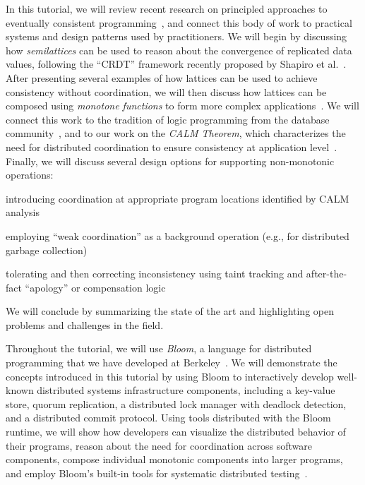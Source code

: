 \documentclass{sig-alternate}
\begin{document}
In this tutorial, we will review recent research on principled approaches to
eventually consistent
programming~\cite{Alvaro2011,Burckhardt2012,Conway2012,Hellerstein2010,Roh2011,Shapiro2011a,Shapiro2011b},
and connect this body of work to practical systems and design patterns used by
practitioners. We will begin by discussing how \emph{semilattices} can be used to
reason about the convergence of replicated data values, following the ``CRDT''
framework recently proposed by Shapiro et
al.~\cite{Shapiro2011a,Shapiro2011b}. After presenting several examples of how
lattices can be used to achieve consistency without coordination, we will then
discuss how lattices can be composed using \emph{monotone functions} to form
more complex applications~\cite{Conway2012}. We will connect this work to the tradition of logic programming from the database community~\cite{AliceBook}, and to our work on the
\emph{CALM Theorem}, which characterizes the need for distributed coordination to 
ensure consistency at application level~\cite{Alvaro2011,Ameloot2011,Hellerstein2010,dedalus-confluence}. Finally,
we will discuss several design options for supporting non-monotonic operations:
\begin{compactenum}[(a)]
\item introducing coordination at appropriate program locations identified by
  CALM analysis
\item employing ``weak coordination'' as a background operation (e.g., for distributed
garbage collection)
\item tolerating and then correcting inconsistency using taint tracking and
after-the-fact ``apology'' or compensation logic~\cite{Garcia-Molina1987,Helland2009,Korth1990}
\end{compactenum}
We will conclude by summarizing the state of the art and highlighting open
problems and challenges in the field.

Throughout the tutorial, we will use \emph{Bloom}, a language for distributed
programming that we have developed at Berkeley~\cite{bloom-website}. We will
demonstrate the concepts introduced in this tutorial by using Bloom to interactively 
develop well-known distributed systems infrastructure components, including a key-value
store, quorum replication, a distributed lock manager with deadlock detection,
and a distributed commit protocol. Using tools distributed with the Bloom
runtime, we will show how developers can visualize the distributed behavior of
their programs, reason about the need for coordination across software components, compose
individual monotonic components into larger programs, and employ Bloom's
built-in tools for systematic distributed testing~\cite{Alvaro2012}.
\end{document}
